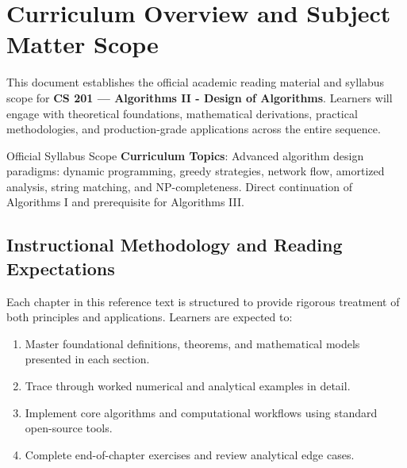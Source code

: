 \section{Curriculum Overview and Subject Matter Scope}

This document establishes the official academic reading material and syllabus scope for \textbf{CS 201 --- Algorithms II - Design of Algorithms}. Learners will engage with theoretical foundations, mathematical derivations, practical methodologies, and production-grade applications across the entire sequence.

\begin{InsightBox}{Official Syllabus Scope}
  \textbf{Curriculum Topics}: Advanced algorithm design paradigms: dynamic programming, greedy strategies, network flow, amortized analysis, string matching, and NP-completeness. Direct continuation of Algorithms I and prerequisite for Algorithms III.
\end{InsightBox}

\subsection{Instructional Methodology and Reading Expectations}

Each chapter in this reference text is structured to provide rigorous treatment of both principles and applications. Learners are expected to:
\begin{enumerate}
  \item Master foundational definitions, theorems, and mathematical models presented in each section.
  \item Trace through worked numerical and analytical examples in detail.
  \item Implement core algorithms and computational workflows using standard open-source tools.
  \item Complete end-of-chapter exercises and review analytical edge cases.
\end{enumerate}

